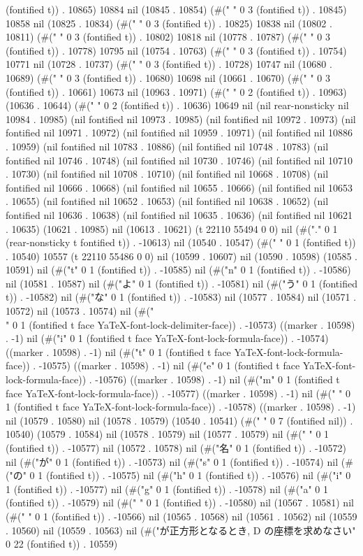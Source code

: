 {(fontified t)) . 10865) 10884 nil (10845 . 10854) (#("   " 0 3 (fontified t)) . 10845) 10858 nil (10825 . 10834) (#("   " 0 3 (fontified t)) . 10825) 10838 nil (10802 . 10811) (#("   " 0 3 (fontified t)) . 10802) 10818 nil (10778 . 10787) (#("   " 0 3 (fontified t)) . 10778) 10795 nil (10754 . 10763) (#("   " 0 3 (fontified t)) . 10754) 10771 nil (10728 . 10737) (#("   " 0 3 (fontified t)) . 10728) 10747 nil (10680 . 10689) (#("   " 0 3 (fontified t)) . 10680) 10698 nil (10661 . 10670) (#("   " 0 3 (fontified t)) . 10661) 10673 nil (10963 . 10971) (#("  " 0 2 (fontified t)) . 10963) (10636 . 10644) (#("  " 0 2 (fontified t)) . 10636) 10649 nil (nil rear-nonsticky nil 10984 . 10985) (nil fontified nil 10973 . 10985) (nil fontified nil 10972 . 10973) (nil fontified nil 10971 . 10972) (nil fontified nil 10959 . 10971) (nil fontified nil 10886 . 10959) (nil fontified nil 10783 . 10886) (nil fontified nil 10748 . 10783) (nil fontified nil 10746 . 10748) (nil fontified nil 10730 . 10746) (nil fontified nil 10710 . 10730) (nil fontified nil 10708 . 10710) (nil fontified nil 10668 . 10708) (nil fontified nil 10666 . 10668) (nil fontified nil 10655 . 10666) (nil fontified nil 10653 . 10655) (nil fontified nil 10652 . 10653) (nil fontified nil 10638 . 10652) (nil fontified nil 10636 . 10638) (nil fontified nil 10635 . 10636) (nil fontified nil 10621 . 10635) (10621 . 10985) nil (10613 . 10621) (t 22110 55494 0 0) nil (#("." 0 1 (rear-nonsticky t fontified t)) . -10613) nil (10540 . 10547) (#(" " 0 1 (fontified t)) . 10540) 10557 (t 22110 55486 0 0) nil (10599 . 10607) nil (10590 . 10598) (10585 . 10591) nil (#("t" 0 1 (fontified t)) . -10585) nil (#("n" 0 1 (fontified t)) . -10586) nil (10581 . 10587) nil (#("よ" 0 1 (fontified t)) . -10581) nil (#("う" 0 1 (fontified t)) . -10582) nil (#("な" 0 1 (fontified t)) . -10583) nil (10577 . 10584) nil (10571 . 10572) nil (10573 . 10574) nil (#("\\" 0 1 (fontified t face YaTeX-font-lock-delimiter-face)) . -10573) ((marker . 10598) . -1) nil (#("i" 0 1 (fontified t face YaTeX-font-lock-formula-face)) . -10574) ((marker . 10598) . -1) nil (#("t" 0 1 (fontified t face YaTeX-font-lock-formula-face)) . -10575) ((marker . 10598) . -1) nil (#("e" 0 1 (fontified t face YaTeX-font-lock-formula-face)) . -10576) ((marker . 10598) . -1) nil (#("m" 0 1 (fontified t face YaTeX-font-lock-formula-face)) . -10577) ((marker . 10598) . -1) nil (#(" " 0 1 (fontified t face YaTeX-font-lock-formula-face)) . -10578) ((marker . 10598) . -1) nil (10579 . 10580) nil (10578 . 10579) (10540 . 10541) (#("       " 0 7 (fontified nil)) . 10540) (10579 . 10584) nil (10578 . 10579) nil (10577 . 10579) nil (#(" " 0 1 (fontified t)) . -10577) nil (10572 . 10578) nil (#("名" 0 1 (fontified t)) . -10572) nil (#("が" 0 1 (fontified t)) . -10573) nil (#("s" 0 1 (fontified t)) . -10574) nil (#("の" 0 1 (fontified t)) . -10575) nil (#("h" 0 1 (fontified t)) . -10576) nil (#("i" 0 1 (fontified t)) . -10577) nil (#("g" 0 1 (fontified t)) . -10578) nil (#("a" 0 1 (fontified t)) . -10579) nil (#(" " 0 1 (fontified t)) . -10580) nil (10567 . 10581) nil (#(" " 0 1 (fontified t)) . -10566) nil (10565 . 10568) nil (10561 . 10562) nil (10559 . 10560) nil (10559 . 10563) nil (#("が正方形となるとき, D の座標を求めなさい" 0 22 (fontified t)) . 10559) }

